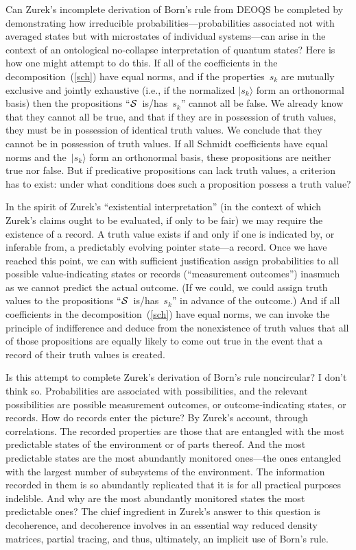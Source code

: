 \documentclass[12pt]{article}
\newcommand{\ket}[1]{\vert#1\rangle}
\newcommand{\cS}{{\cal S}}
\begin{document}
Can Zurek's incomplete derivation of Born's rule from DEOQS be completed by 
demonstrating how irreducible probabilities---probabilities associated not with 
averaged states but with microstates of individual systems---can arise in the 
context of an ontological no-collapse interpretation of quantum states? Here is 
how one might attempt to do this. If all of the coefficients in the 
decomposition~(\ref{sch}) have equal norms, and if the properties~$s_k$ are 
mutually exclusive and jointly exhaustive (i.e., if the normalized $\ket{s_k}$ 
form an orthonormal basis) then the propositions ``$\cS$~is/has~$s_k$'' 
cannot all be false. We already know that they cannot all be true, and that if they 
are in possession of truth values, they must be in possession of identical truth 
values. We conclude that they cannot be in possession of truth values. If all 
Schmidt coefficients have equal norms and the~$\ket{s_k}$ form an 
orthonormal basis, these propositions are neither true nor false. But if predicative 
propositions can lack truth values, a criterion has to exist: under what conditions 
does such a proposition possess a truth value?

In the spirit of Zurek's ``existential interpretation'' \cite{ZurekRMP,ZurekRG} 
(in the context of which Zurek's claims ought to be evaluated, if only to be fair) 
we may require the existence of a record. A truth value exists if and only if one is 
indicated by, or inferable from, a predictably evolving pointer state---a record. 
Once we have reached this point, we can with sufficient justification assign 
probabilities to all possible value-indicating states or records (``measurement 
outcomes'') inasmuch as we cannot predict the actual outcome. (If we could, we 
could assign truth values to the propositions ``$\cS$~is/has~$s_k$'' in advance 
of the outcome.) And if all coefficients in the decomposition~(\ref{sch}) have 
equal norms, we can invoke the principle of indifference and deduce from the 
nonexistence of truth values that all of those propositions are equally likely to 
come out true in the event that a record of their truth values is created.

Is this attempt to complete Zurek's derivation of Born's rule noncircular? I don't 
think so. Probabilities are associated with possibilities, and the relevant 
possibilities are possible measurement outcomes, or outcome-indicating states, 
or records. How do records enter the picture? By Zurek's account, through 
correlations. The recorded properties are those that are entangled with the most 
predictable states of the environment or of parts thereof. And the most 
predictable states are the most abundantly monitored ones---the ones entangled 
with the largest number of subsystems of the environment. The information 
recorded in them is so abundantly replicated that it is for all practical purposes 
indelible. And why are the most abundantly monitored states the most 
predictable ones? The chief ingredient in Zurek's answer to this question is 
decoherence, and decoherence involves in an essential way reduced density 
matrices, partial tracing, and thus, ultimately, an implicit use of Born's rule.
\end{document}
